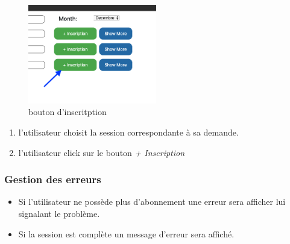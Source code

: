 \begin{figure}[!h]
	\includegraphics[width=0.5\textwidth,center]{Figures/us3-1}
	\caption{bouton d'inscritption}
\end{figure}

\begin{enumerate}
	\item l'utilisateur choisit la session correspondante à sa demande.
	\item l'utilisateur click sur le bouton  \textit{+ Inscription}
\end{enumerate}

\subsubsection{Gestion des erreurs}
	\begin{itemize}
		\item Si l'utilisateur ne possède plus d'abonnement une erreur sera afficher lui signalant le problème. 
		\item Si la session est complète un message d'erreur sera affiché. 
	\end{itemize}
